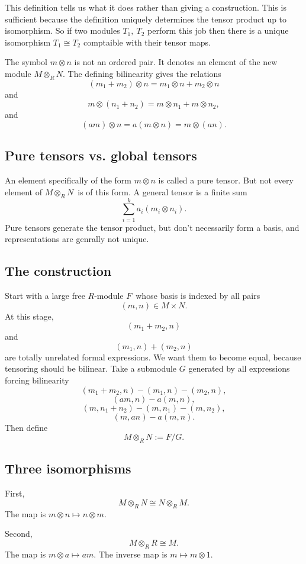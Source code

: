 \documentclass[11pt]{article}
\begin{document}
This definition tells us what it does rather 
than giving a construction. 
This is sufficient because the definition uniquely 
determines the tensor product up to isomorphism. 
So if two modules $T_1, \ T_2$ perform this job then there 
is a unique isomorphism $T_1 \cong T_2$ comptaible 
with their tensor maps. 

The symbol $m \otimes n$ is not an ordered pair.  
It denotes an element of the new module 
$M \otimes_R N$. 
The defining bilinearity gives the relations 
\[
    (m_1 + m_2) \otimes n = m_1 \otimes n + 
    m_2 \otimes n  
\]
and 
\[
    m \otimes (n_1 + n_2) 
    = m \otimes n_1 + m \otimes n_2,  
\]
and 
\[
    (am) \otimes n = a(m\otimes n) = m\otimes (an).  
\]

\subsection{Pure tensors vs. global tensors} 
An element specifically of the form $m \otimes n$ 
is called a pure tensor. 
But not every element of $M \otimes_R N$ is of this form. 
A general tensor is a finite sum 
\[
    \sum_{i=1}^k a_i(m_i \otimes n_i). 
\]
Pure tensors generate the tensor product, but 
don't necessarily form a basis, and representations 
are genrally not unique. 

\subsection{The construction}
Start with a large free $R$-module $F$ whose basis 
is indexed by all pairs 
\[
    (m,n) \in M \times N. 
\]
At this stage,
\[
    (m_1 + m_2, n)
\]
and 
\[
    (m_1, n) + (m_2,n)
\]
are totally unrelated formal expressions.
We want them to become equal, because tensoring 
should be bilinear. 
Take a submodule $G$ generated by all expressions forcing 
bilinearity 
\[
    (m_1+m_2, n) - (m_1,n) - (m_2,n), 
\]
\[
    (am,n) - a(m,n), 
\]
\[
    (m,n_1+n_2) - (m,n_1) - (m,n_2), 
\]
\[
    (m,an) - a(m,n). 
\]
Then define 
\[
    M \otimes_R N := F/G. 
\]

\subsection{Three isomorphisms}
First, 
\[
    M \otimes_R N \cong N \otimes_R M. 
\]
The map is $m \otimes n \mapsto n \otimes m$. 

Second, 
\[
    M \otimes_R R \cong M. 
\]
The map is $m \otimes a \mapsto am$. 
The inverse map is $m \mapsto m \otimes 1$. 
\end{document}
